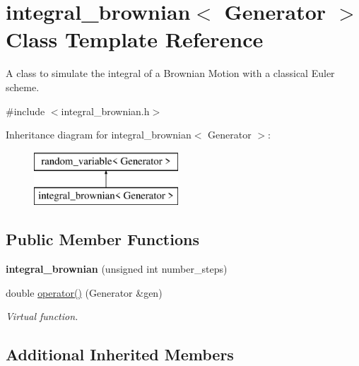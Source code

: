 \hypertarget{classintegral__brownian}{}\section{integral\+\_\+brownian$<$ Generator $>$ Class Template Reference}
\label{classintegral__brownian}


A class to simulate the integral of a Brownian Motion with a classical Euler scheme.  




{\ttfamily \#include $<$integral\+\_\+brownian.\+h$>$}

Inheritance diagram for integral\+\_\+brownian$<$ Generator $>$\+:\begin{figure}[H]
\begin{center}
\leavevmode
\includegraphics[height=2.000000cm]{classintegral__brownian}
\end{center}
\end{figure}
\subsection*{Public Member Functions}
\begin{DoxyCompactItemize}
\item 
\mbox{\label{classintegral__brownian_acbb676c9fb27ebd1de72f9dda5e2bbbf}} 
{\bfseries integral\+\_\+brownian} (unsigned int number\+\_\+steps)
\item 
\mbox{\label{classintegral__brownian_a974ec7d678079bc1acdc691a506a3092}} 
double \mbox{\hyperlink{classintegral__brownian_a974ec7d678079bc1acdc691a506a3092}{operator()}} (Generator \&gen)
\begin{DoxyCompactList}\small\item\em Virtual function. \end{DoxyCompactList}\end{DoxyCompactItemize}
\subsection*{Additional Inherited Members}


